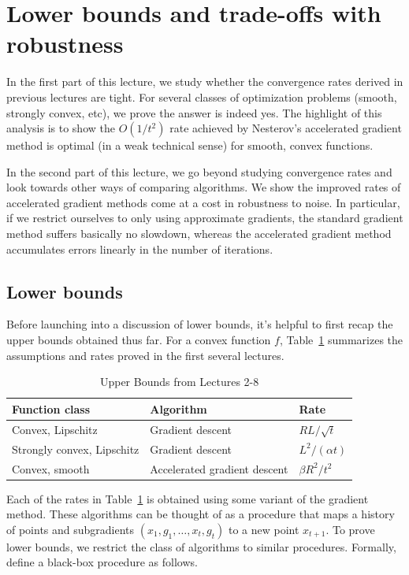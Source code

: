 \section{Lower bounds and trade-offs with robustness}

In the first part of this lecture, we study whether the convergence rates
derived in previous lectures are tight. For several classes of optimization
problems (smooth, strongly convex, etc), we prove the
answer is indeed yes. The highlight of this analysis is to show the $O(1/t^2)$
rate achieved by Nesterov's accelerated gradient method is optimal (in a weak
technical sense) for smooth, convex functions. 

In the second part of this lecture, we go beyond studying convergence rates and
look towards other ways of comparing algorithms. We show the improved rates of
accelerated gradient methods come at a cost in robustness to noise. In
particular, if we restrict ourselves to only using approximate gradients, the
standard gradient method suffers basically no slowdown, whereas the accelerated
gradient method accumulates errors linearly in the number of iterations.

\subsection{Lower bounds}
Before launching into a discussion of lower bounds, it's helpful to first recap
the upper bounds obtained thus far. For a convex function $f$,
Table~\ref{table:upper-bounds} summarizes the assumptions and rates proved in
the first several lectures. 
~
\begin{table}[]
\centering
\caption{Upper Bounds from Lectures 2-8}
\label{table:upper-bounds}
\begin{tabular}{|l|l|l|}
\hline
Function class                        & Algorithm                    & Rate                                            \\ \hline
Convex, Lipschitz          & Gradient descent             & $RL / \sqrt{t}$                               \\ \hline
Strongly convex, Lipschitz & Gradient descent             & $L^2 / (\alpha t)$                \\ \hline
Convex, smooth             & Accelerated gradient descent & $\beta R^2 / t^2$ \\ \hline
\end{tabular}
\end{table}  

Each of the rates in Table~\ref{table:upper-bounds} is obtained using some variant of the
gradient method. These algorithms can be thought of as a procedure that
maps a history of points and subgradients $(x_1, g_1, \dots, x_t, g_t)$ to a 
new point $x_{t+1}$. To prove lower bounds, we restrict the class of algorithms 
to similar procedures. Formally, define a black-box procedure as follows.

